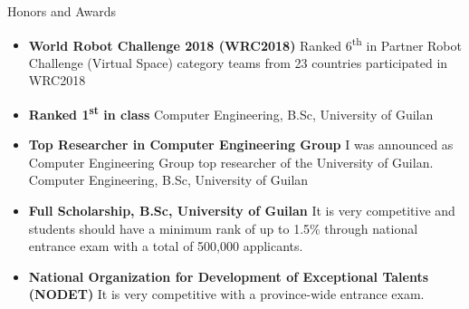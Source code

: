 \documentclass[]{mcdowellcv}
\begin{document}
    \begin{cvsection}{Honors and Awards}
    	\begin{cvsubsection}{}{}{}	
    		\begin{itemize}
    			\item \textbf{World Robot Challenge 2018 (WRC2018)} \newline
    			Ranked 6\textsuperscript{th} in Partner Robot Challenge (Virtual Space) category  teams from 23 countries participated in WRC2018
    			\item \textbf{Ranked 1\textsuperscript{st} in class} \newline
    			Computer Engineering, B.Sc, University of Guilan
    			\item \textbf{Top Researcher in Computer Engineering Group} \newline
    			I was announced as Computer Engineering Group top researcher of the University of Guilan.
    			Computer Engineering, B.Sc, University of Guilan
    			\item \textbf{Full Scholarship, B.Sc, University of Guilan} \newline
    			 It is very competitive and students should have a minimum rank of up to 1.5\% through national entrance exam with a total of 500,000 applicants.
                \item \textbf{National Organization for Development of Exceptional Talents (NODET)} \newline
                It is very competitive with a province-wide entrance exam.
    		\end{itemize}
    	\end{cvsubsection}
    \end{cvsection}
\end{document}
